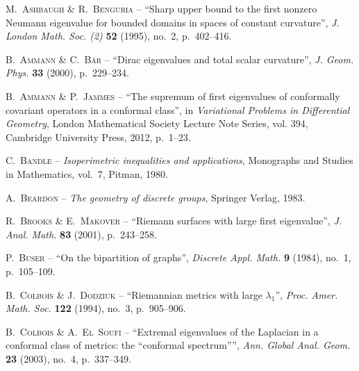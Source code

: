 \documentclass[11pt,a4paper]{smfart}
\begin{document}
\providecommand{\bysame}{\leavevmode ---\ }
\providecommand{\og}{``}
\providecommand{\fg}{''}
\providecommand{\smfandname}{\&}
\providecommand{\smfedsname}{\'eds.}
\providecommand{\smfedname}{\'ed.}
\providecommand{\smfmastersthesisname}{M\'emoire}
\providecommand{\smfphdthesisname}{Th\`ese}
\begin{thebibliography}{{Mc}{G}93}

{\scshape M.~Ashbaugh {\normalfont \smfandname} R.~Benguria} -- {\og Sharp
  upper bound to the first nonzero {N}eumann eigenvalue for bounded domains in
  spaces of constant curvature\fg}, \emph{J. London Math. Soc. (2)} \textbf{52}
  (1995), no.~2, p.~402--416.

{\scshape B.~Ammann {\normalfont \smfandname} C.~B\"ar} -- {\og Dirac
  eigenvalues and total scalar curvature\fg}, \emph{J. Geom. Phys.} \textbf{33}
  (2000), p.~229--234.

{\scshape B.~Ammann {\normalfont \smfandname} P.~Jammes} -- {\og The supremum
  of first eigenvalues of conformally covariant operators in a conformal
  class\fg}, in \emph{Variational Problems in Differential Geometry}, London
  Mathematical Society Lecture Note Series, vol. 394, Cambridge University
  Press, 2012, p.~1--23.

{\scshape C.~Bandle} -- \emph{Isoperimetric inequalities and applications},
  Monographs and Studies in Mathematics, vol.~7, Pitman, 1980.

{\scshape A.~Beardon} -- \emph{The geometry of discrete groups}, Springer
  Verlag, 1983.

{\scshape R.~Brooks {\normalfont \smfandname} E.~Makover} -- {\og Riemann
  surfaces with large first eigenvalue\fg}, \emph{J. Anal. Math.} \textbf{83}
  (2001), p.~243--258.

{\scshape P.~Buser} -- {\og On the bipartition of graphs\fg}, \emph{Discrete
  Appl. Math.} \textbf{9} (1984), no.~1, p.~105--109.

{\scshape B.~Colbois {\normalfont \smfandname} J.~Dodziuk} -- {\og Riemannian
  metrics with large $\lambda_1$\fg}, \emph{Proc. Amer. Math. Soc.}
  \textbf{122} (1994), no.~3, p.~905--906.

{\scshape B.~Colbois {\normalfont \smfandname} A.~El~Soufi} -- {\og Extremal
  eigenvalues of the {L}aplacian in a conformal class of metrics: the
  ``conformal spectrum''\fg}, \emph{Ann. Global Anal. Geom.} \textbf{23}
  (2003), no.~4, p.~337--349.


\end{thebibliography}
\end{document}
